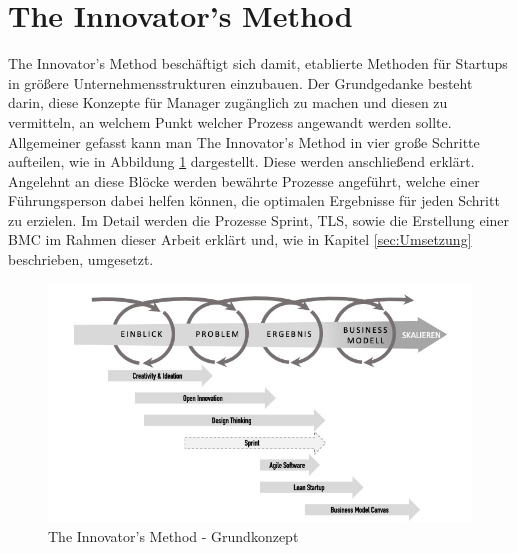 \section{The Innovator's Method}
\label{sec:TheInnovatorsMethod}
The Innovator's Method beschäftigt sich damit, etablierte Methoden für Startups in größere Unternehmensstrukturen einzubauen. Der Grundgedanke besteht darin, diese Konzepte für Manager zugänglich zu machen und diesen zu vermitteln, an welchem Punkt welcher Prozess angewandt werden sollte. Allgemeiner gefasst kann man The Innovator's Method in vier große Schritte aufteilen, wie in Abbildung \ref{fig:TheInnovatorsMethod} dargestellt. Diese werden anschließend erklärt. Angelehnt an diese Blöcke werden bewährte Prozesse angeführt, welche einer Führungsperson dabei helfen können, die optimalen Ergebnisse für jeden Schritt zu erzielen.
Im Detail werden die Prozesse Sprint, \ac{TLS}, sowie die Erstellung einer \ac{BMC} im Rahmen dieser Arbeit erklärt und, wie in Kapitel \ref{sec:Umsetzung} beschrieben, umgesetzt.

\begin{figure}[h!]
	\begin{center}
		\includegraphics[width=\textwidth]{99_IMG/02_Grundlagen/innovatorsMethod.jpg}
		\caption{The Innovator's Method - Grundkonzept}
		\label{fig:TheInnovatorsMethod}
	\end{center}
\end{figure}

